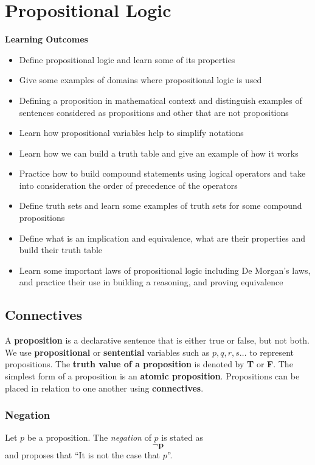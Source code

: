 \section{Propositional Logic}
\begin{mdframed}
\textbf{Learning Outcomes}
\begin{itemize}[label={\( \checkmark \)}]
\item Define propositional logic and learn some of its properties 
\item Give some examples of domains where 
	propositional logic is used  
\item Defining a proposition in mathematical context and distinguish examples of sentences considered as propositions and other that are not propositions 
\item Learn how propositional variables help to simplify notations 
\item Learn how we can build a truth table and give an example of how it works 
\item Practice how to build compound statements using logical operators and take into consideration the order of precedence of the operators 
\item Define truth sets and learn some examples of truth sets for some compound propositions 
\item Define what is an implication and equivalence, what are their properties and build their truth table 
\item Learn some important laws of propositional logic including De Morgan’s laws, and practice their use in building a reasoning, and proving equivalence
\end{itemize}
\end{mdframed}
\subsection{Connectives}
A \textbf{proposition} is a declarative sentence that is either true or false, but not both. We use \textbf{propositional} or \textbf{sentential} variables such as \(p,q,r,s \ldots \) to represent propositions. The \textbf{truth value of a proposition} is denoted by \textbf{T} or \textbf{F}. The simplest form of a proposition is an \textbf{atomic proposition}. Propositions can be placed in relation to one another using \textbf{connectives}.

\subsubsection{Negation}
Let \( p \) be a proposition. The \emph{negation} of \(p\) is stated as \[\mathbf{\neg p}\]
and proposes that ``It is not the case that \(p\)''.

